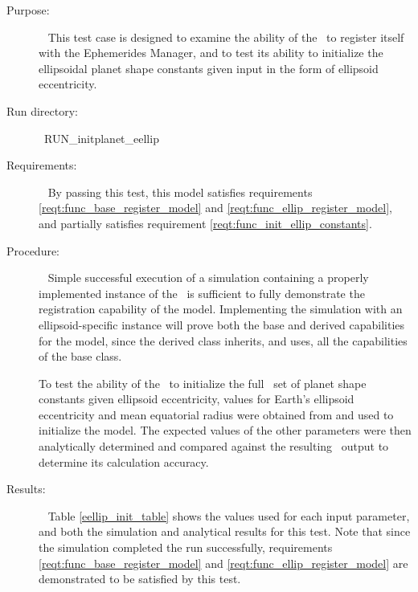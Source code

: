 \begin{description}
\item[Purpose:]\ \newline
This test case is designed to examine the ability of the \planetDesc\ to
register itself with the Ephemerides Manager, and to test its ability to
initialize the ellipsoidal planet shape constants given input in the form of
ellipsoid eccentricity.
\item[Run directory:]\ \newline RUN\_initplanet\_eellip
\item[Requirements:]\ \newline
By passing this test, this model satisfies requirements
\mbox{\ref{reqt:func_base_register_model}} and
\mbox{\ref{reqt:func_ellip_register_model}}, and partially satisfies
requirement \mbox{\ref{reqt:func_init_ellip_constants}}.

\item[Procedure:]\ \newline
Simple successful execution of a simulation containing a properly implemented
instance of the \planetDesc\ is sufficient to fully demonstrate the
registration capability of the model. Implementing the simulation with an
ellipsoid-specific instance will prove both the base and derived capabilities
for the model, since the derived class inherits, and uses, all the capabilities
of the base class.

To test the ability of the \planetDesc\ to initialize the full \JEODid\ set of
planet shape constants given ellipsoid eccentricity, values for Earth's
ellipsoid eccentricity and mean equatorial radius were obtained from
\cite{ValladoSecond} and used to initialize the model.  The expected values of
the other parameters were then analytically determined and compared against the
resulting \planetDesc\ output to determine its calculation accuracy.

\item[Results:]\ \newline
Table \ref{eellip_init_table} shows the values used for each input parameter,
and both the simulation and analytical results for this test. Note that since
the simulation completed the run successfully, requirements
\mbox{\ref{reqt:func_base_register_model}} and
\mbox{\ref{reqt:func_ellip_register_model}} are demonstrated to be satisfied by
this test.


\end{description}
